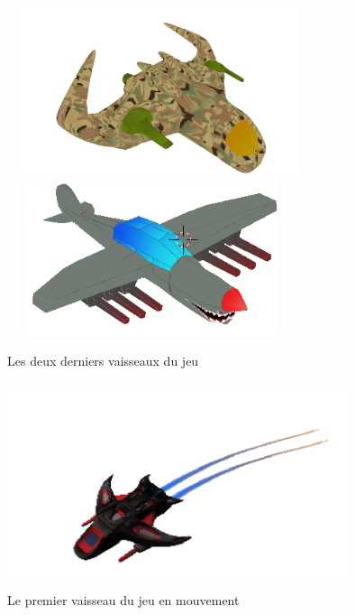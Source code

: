 \documentclass[12pt, titlepage]{article}
\begin{document}
\begin{spacing}{1.5}
\begin{figure}[h]
\center
\includegraphics[height=5cm, width=9cm]{vaisseau2.png}
\includegraphics[height=4.5cm, width=8.5cm]{sharknado.png}
\caption{Les deux derniers vaisseaux du jeu}
\end{figure}

\begin{figure}[h]
\center
\includegraphics[height=6cm, width=10cm]{vaisseau_bouge.png}
\caption{Le premier vaisseau du jeu en mouvement}
\end{figure}

\end{spacing}
\end{document}
